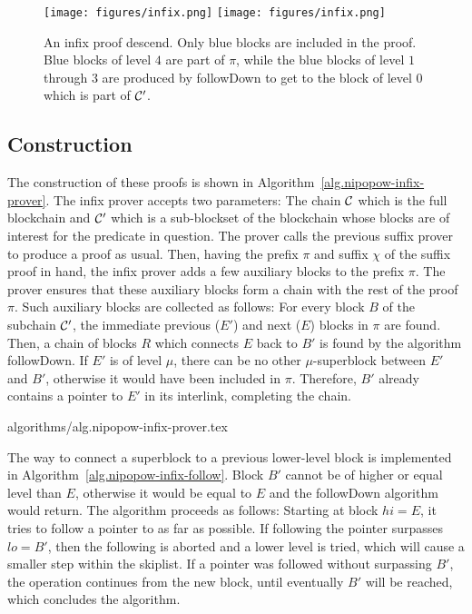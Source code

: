 \begin{figure}[h]
    \caption{An infix proof descend. Only blue blocks are included in the proof.
    Blue blocks of level $4$ are part of $\pi$, while the blue blocks of level
    $1$ through $3$ are produced by followDown to get to the block of level $0$
    which is part of $\mathcal{C}'$.}
    \centering
    \iftwocolumn
        \texttt{[image: figures/infix.png]}
    \else
        \texttt{[image: figures/infix.png]}
    \fi
    \label{fig.infix}
\end{figure}

\subsection{Construction}

The construction of these proofs is shown in
Algorithm~\ref{alg.nipopow-infix-prover}. The infix prover accepts two
parameters: The chain $\mathcal{C}$ which is the full blockchain and $\mathcal{C}'$ which
is a sub-blockset of the blockchain whose blocks are of interest for the
predicate in question. The prover calls the previous suffix prover to produce a
proof as usual. Then, having the prefix $\pi$ and suffix $\chi$ of the suffix
proof in hand, the infix prover adds a few auxiliary blocks to the prefix $\pi$.
The prover ensures that these auxiliary blocks form a chain with the rest of the
proof $\pi$. Such auxiliary blocks are collected as follows: For every block $B$
of the subchain $\mathcal{C}'$, the immediate previous ($E'$) and next ($E$) blocks
in $\pi$ are found. Then, a chain of blocks $R$ which connects $E$ back to $B'$
is found by the algorithm followDown. If $E'$ is of level $\mu$, there can be no
other $\mu$-superblock between $E'$ and $B'$, otherwise it would have been
included in $\pi$. Therefore, $B'$ already contains a pointer to $E'$ in its
interlink, completing the chain.

{algorithms/alg.nipopow-infix-prover.tex}

The way to connect a superblock to a previous lower-level block is implemented
in Algorithm~\ref{alg.nipopow-infix-follow}.  Block $B'$ cannot be of higher or
equal level than $E$, otherwise it would be equal to $E$ and the followDown
algorithm would return. The algorithm proceeds as follows: Starting at block $hi =
E$, it tries to follow a pointer to as far as possible. If following the pointer
surpasses $lo = B'$, then the following is aborted and a lower level is tried,
which will cause a smaller step within the skiplist. If a pointer was followed
without surpassing $B'$, the operation continues from the new block, until
eventually $B'$ will be reached, which concludes the algorithm.

